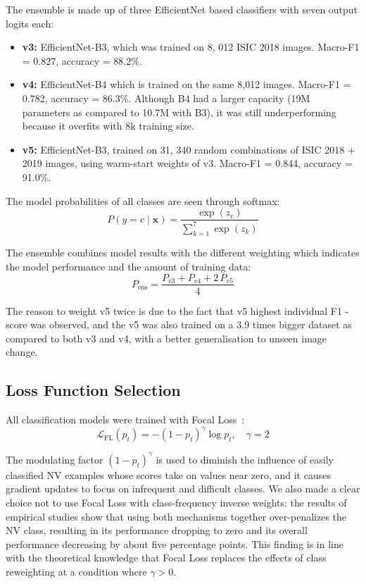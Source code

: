 \documentclass[conference]{IEEEtran}
\begin{document}
The ensemble is made up of three EfficientNet based classifiers with seven output logits each:

\begin{itemize}
\item \textbf{v3:} EfficientNet-B3, which was trained on 8, 012 ISIC 2018 images. Macro-F1 = 0.827, accuracy = 88.2\%.
\item \textbf{v4:} EfficientNet-B4 which is trained on the same 8,012 images. Macro-F1 = 0.782, accuracy = 86.3\%. Although B4 had a larger capacity (19M parameters as compared to 10.7M with B3), it was still underperforming because it overfits with 8k training size.
\item \textbf{v5:} EfficientNet-B3, trained on 31, 340 random combinations of ISIC 2018 + 2019 images, using warm-start weights of v3. Macro-F1 = 0.844, accuracy = 91.0\%.
\end{itemize}

The model probabilities of all classes are seen through softmax:
\begin{equation}
P(y = c \mid \mathbf{x}) = \frac{\exp(z_c)}{\sum_{k=1}^{7} \exp(z_k)}
\end{equation}

The ensemble combines model results with the different weighting which indicates the model performance and the amount of training data:
\begin{equation}
P_{\text{ens}} = \frac{P_{v3} + P_{v4} + 2\,P_{v5}}{4}
\label{eq:ensemble}
\end{equation}

The reason to weight v5 twice is due to the fact that v5 highest individual F1 -score was observed, and the v5 was also trained on a 3.9 times bigger dataset as compared to both v3 and v4, with a better generalisation to unseen image change.

\subsection{Loss Function Selection}

All classification models were trained with Focal Loss~\cite{lin2017focal}:
\begin{equation}
\mathcal{L}_{\text{FL}}(p_t) = -(1 - p_t)^{\gamma}\log p_t, \quad \gamma = 2
\end{equation}

The modulating factor $(1-p_t)^\gamma$ is used to diminish the influence of easily classified NV examples whose scores take on values near zero, and it causes gradient updates to focus on infrequent and difficult classes. We also made a clear choice not to use Focal Loss with class-frequency inverse weights: the results of empirical studies show that using both mechanisms together over-penalizes the NV class, resulting in its performance dropping to zero and its overall performance decreasing by about five percentage points. This finding is in line with the theoretical knowledge that Focal Loss replaces the effects of class reweighting at a condition where $\gamma > 0$.
\end{document}
